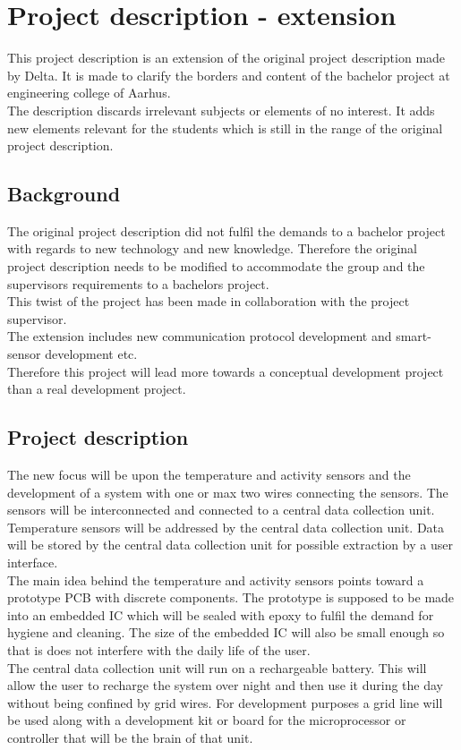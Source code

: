 \chapter{Project description - extension}
This project description is an extension of the original project description made by Delta. It is made to clarify the borders and content of the bachelor project at engineering college of Aarhus.\\
The description discards irrelevant subjects or elements of no interest. It adds new elements relevant for the students which is still in the range of the original project description.


\section{Background}
The original project description did not fulfil the demands to a bachelor project with regards to new technology and new knowledge. Therefore the original project description needs to be modified to accommodate the group and the supervisors requirements to a bachelors project. \\
This twist of the project has been made in collaboration with the project supervisor.\\
The extension includes new communication protocol development and smart-sensor development etc.\\
Therefore this project will lead more towards a conceptual development project than a real development project.\\


\section{Project description}
The new focus will be upon the temperature and activity sensors and the development of a system with one or max two wires connecting the sensors. The sensors will be interconnected and connected to a central data collection unit. Temperature sensors will be addressed by the central data collection unit. Data will be stored by the central data collection unit for possible extraction by a user interface. \\

The main idea behind the temperature and activity sensors points toward a prototype PCB with discrete components. The prototype is supposed to be made into an embedded IC which will be sealed with epoxy to fulfil the demand for hygiene and cleaning. The size of the embedded IC will also be small enough so that is does not interfere with the daily life of the user. \\

The central data collection unit will run on a rechargeable battery. This will allow the user to recharge the system over night and then use it during the day without being confined by grid wires. For development purposes a grid line will be used along with a development kit or board for the microprocessor or controller that will be the brain of that unit. \\


